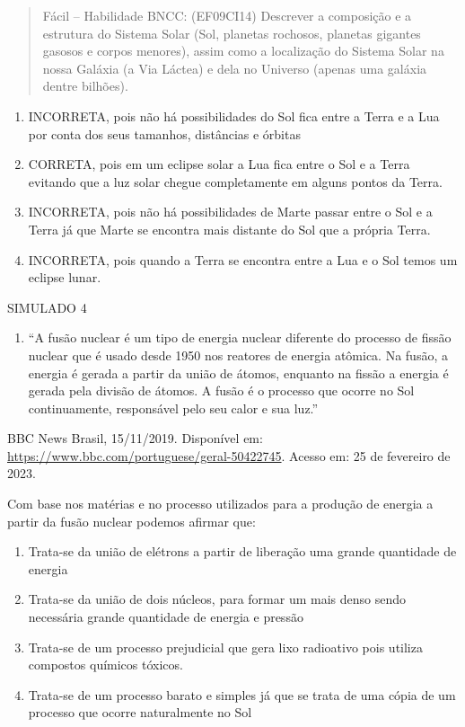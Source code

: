 \begin{quote}
Fácil -- Habilidade BNCC: (EF09CI14) Descrever a composição e a
estrutura do Sistema Solar (Sol, planetas rochosos, planetas gigantes
gasosos e corpos menores), assim como a localização do Sistema Solar na
nossa Galáxia (a Via Láctea) e dela no Universo (apenas uma galáxia
dentre bilhões).
\end{quote}

\begin{enumerate}
\def\labelenumi{(\Alph{enumi})}
\item
  INCORRETA, pois não há possibilidades do Sol fica entre a Terra e a
  Lua por conta dos seus tamanhos, distâncias e órbitas
\item
  CORRETA, pois em um eclipse solar a Lua fica entre o Sol e a Terra
  evitando que a luz solar chegue completamente em alguns pontos da
  Terra.
\item
  INCORRETA, pois não há possibilidades de Marte passar entre o Sol e a
  Terra já que Marte se encontra mais distante do Sol que a própria
  Terra.
\item
  INCORRETA, pois quando a Terra se encontra entre a Lua e o Sol temos
  um eclipse lunar.
\end{enumerate}

SIMULADO 4

\begin{enumerate}
\def\labelenumi{\arabic{enumi})}
\item
  ``A fusão nuclear é um tipo de energia nuclear diferente do processo
  de fissão nuclear que é usado desde 1950 nos reatores de energia
  atômica. Na fusão, a energia é gerada a partir da união de átomos,
  enquanto na fissão a energia é gerada pela divisão de átomos. A fusão
  é o processo que ocorre no Sol continuamente, responsável pelo seu
  calor e sua luz.''
\end{enumerate}

BBC News Brasil, 15/11/2019. Disponível em:
\url{https://www.bbc.com/portuguese/geral-50422745}. Acesso em: 25 de
fevereiro de 2023.

Com base nos matérias e no processo utilizados para a produção de
energia a partir da fusão nuclear podemos afirmar que:

\begin{enumerate}
\def\labelenumi{(\Alph{enumi})}
\item
  Trata-se da união de elétrons a partir de liberação uma grande
  quantidade de energia
\item
  Trata-se da união de dois núcleos, para formar um mais denso sendo
  necessária grande quantidade de energia e pressão
\item
  Trata-se de um processo prejudicial que gera lixo radioativo pois
  utiliza compostos químicos tóxicos.
\item
  Trata-se de um processo barato e simples já que se trata de uma cópia
  de um processo que ocorre naturalmente no Sol
\end{enumerate}

